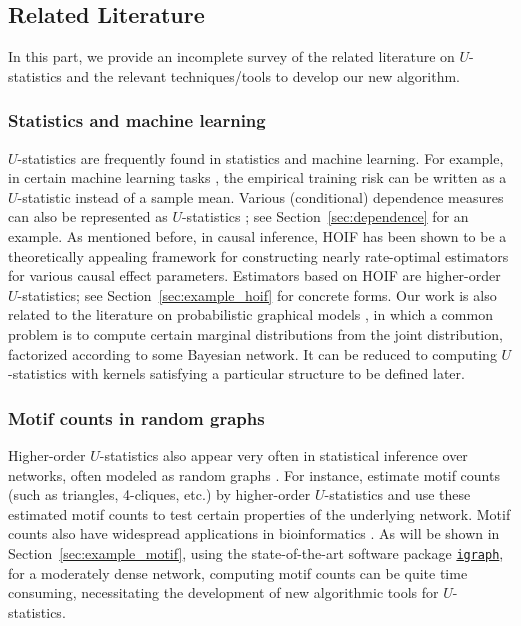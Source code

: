 \documentclass[12pt]{article}
\newcommand{\libref}[2]{\href{#2}{\texttt{#1}}}
\def\igraph{\libref{igraph}{https://igraph.org/}}
\theoremstyle{plain}
\theoremstyle{definition}
\def\igraph{\libref{igraph}{https://igraph.org/}}
\begin{document}
\begin{bibunit}[agsm]
\subsection*{Related Literature}

In this part, we provide an incomplete survey of the related literature on $U$-statistics and the relevant techniques/tools to develop our new algorithm.

\subsubsection*{Statistics and machine learning}

$U$-statistics are frequently found in statistics and machine learning. For example, in certain machine learning tasks \citep{clemenccon2008ranking, clemenccon2013maximal, shen2025engression}, the empirical training risk can be written as a $U$-statistic instead of a sample mean. Various (conditional) dependence measures can also be represented as $U$-statistics \citep{yao2018testing, he2021asymptotically, shao2025u, zhang2025adaptive}; see Section~\ref{sec:dependence} for an example. As mentioned before, in causal inference, HOIF has been shown to be a theoretically appealing framework for constructing nearly rate-optimal estimators for various causal effect parameters. Estimators based on HOIF are higher-order $U$-statistics; see Section~\ref{sec:example_hoif} for concrete forms. Our work is also related to the literature on probabilistic graphical models \citep{pearl1988probabilistic, shpitser2011efficient}, in which a common problem is to compute certain marginal distributions from the joint distribution, factorized according to some Bayesian network. It can be reduced to computing $U$-statistics with kernels satisfying a particular structure to be defined later.


\subsubsection*{Motif counts in random graphs}

Higher-order $U$-statistics also appear very often in statistical inference over networks, often modeled as random graphs \citep{chatterjee2024higher, jin2025counting}. For instance, \citet{chatterjee2024higher} estimate motif counts (such as triangles, 4-cliques, etc.) by higher-order $U$-statistics and use these estimated motif counts to test certain properties of the underlying network. Motif counts also have widespread applications in bioinformatics \citep{wernicke2006fanmod}. As will be shown in Section~\ref{sec:example_motif}, using the state-of-the-art software package \igraph{}, for a moderately dense network, computing motif counts can be quite time consuming, necessitating the development of new algorithmic tools for $U$-statistics. 


\end{bibunit}
\end{document}
